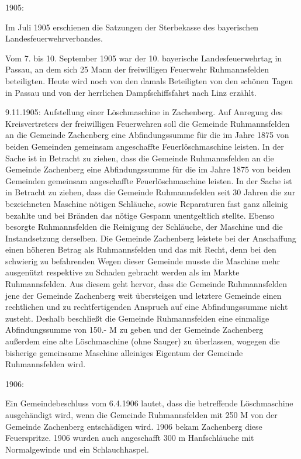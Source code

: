 \documentclass[12pt,a4pager]{book}
\begin{document}
1905:

Im Juli 1905 erschienen die Satzungen der Sterbekasse des bayerischen
Landesfeuerwehrverbandes.

Vom 7. bis 10. September 1905 war der 10. bayerische Landesfeuerwehrtag in
Passau, an dem sich 25 Mann der freiwilligen Feuerwehr Ruhmannsfelden
beteiligten. Heute wird noch von den damals Beteiligten von den schönen Tagen in
Passau und von der herrlichen Dampfschiffsfahrt nach Linz erzählt.

9.11.1905: Aufstellung einer Löschmaschine in Zachenberg. Auf Anregung des
Kreisvertreters der freiwilligen Feuerwehren soll die Gemeinde Ruhmannsfelden an
die Gemeinde Zachenberg eine Abfindungssumme für die im Jahre 1875 von beiden
Gemeinden gemeinsam angeschaffte Feuerlöschmaschine leisten. In der Sache ist in
Betracht zu ziehen, dass die Gemeinde Ruhmannsfelden an die Gemeinde Zachenberg
eine Abfindungssumme für die im Jahre 1875 von beiden Gemeinden gemeinsam
angeschaffte Feuerlöschmaschine leisten. In der Sache ist in Betracht zu ziehen,
dass die Gemeinde Ruhmannsfelden seit 30 Jahren die zur bezeichneten Maschine
nötigen Schläuche, sowie Reparaturen fast ganz alleinig bezahlte und bei Bränden
das nötige Gespann unentgeltlich stellte. Ebenso besorgte Ruhmannsfelden die
Reinigung der Schläuche, der Maschine und die Instandsetzung derselben. Die
Gemeinde Zachenberg leistete bei der Anschaffung einen höheren Betrag als
Ruhmannsfelden und das mit Recht, denn bei den schwierig zu befahrenden Wegen
dieser Gemeinde musste die Maschine mehr ausgenützt respektive zu Schaden
gebracht werden als im Markte Ruhmannsfelden. Aus diesem geht hervor, dass die
Gemeinde Ruhmannsfelden jene der Gemeinde Zachenberg weit übersteigen und
letztere Gemeinde einen rechtlichen und zu rechtfertigenden Anspruch auf eine
Abfindungssumme nicht zusteht. Deshalb beschließt die Gemeinde Ruhmannsfelden
eine einmalige Abfindungssumme von 150.- M zu geben und der Gemeinde Zachenberg
außerdem eine alte Löschmaschine (ohne Sauger) zu überlassen, wogegen die
bisherige gemeinsame Maschine alleiniges Eigentum der Gemeinde Ruhmannsfelden
wird.

1906:

Ein Gemeindebeschluss vom 6.4.1906 lautet, dass die betreffende Löschmaschine
ausgehändigt wird, wenn die Gemeinde Ruhmannsfelden mit 250 M von der Gemeinde
Zachenberg entschädigen wird. 1906 bekam Zachenberg diese Feuerspritze. 1906
wurden auch angeschafft 300 m Hanfschläuche mit Normalgewinde und ein
Schlauchhaspel.
\end{document}
